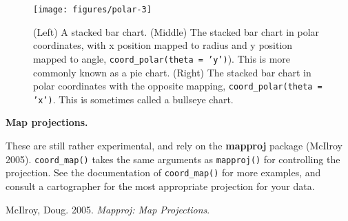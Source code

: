 \begin{figure}
\texttt{[image: figures/polar-3]} \caption{(Left) A stacked bar chart.  (Middle) The stacked bar chart in polar coordinates, with x position mapped to radius and y position mapped to angle, \texttt{coord\_polar(theta = 'y')}).  This is more commonly known as a pie chart.  (Right) The stacked bar chart in polar coordinates with the opposite mapping, \texttt{coord\_polar(theta = 'x')}. This is sometimes called a bullseye chart.\label{fig:polar3}}
\end{figure}

\textbf{Map projections.}

These are still rather experimental, and rely on the \textbf{mapproj}
package (McIlroy 2005). \texttt{coord\_map()} takes the same arguments
as \texttt{mapproj()} for controlling the projection. See the
documentation of \texttt{coord\_map()} for more examples, and consult a
cartographer for the most appropriate projection for your data.
 

McIlroy, Doug. 2005. \emph{Mapproj: Map Projections}.
